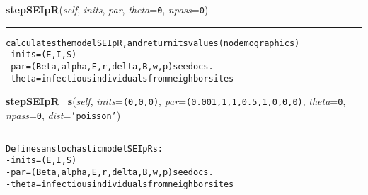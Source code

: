     \vspace{0.5ex}

    \begin{boxedminipage}{\textwidth}

    \raggedright \textbf{stepSEIpR}(\textit{self}, \textit{inits}, \textit{par}, \textit{theta}=\texttt{0}, \textit{npass}=\texttt{0})

    \vspace{-1.5ex}

    \rule{\textwidth}{0.5\fboxrule}
\begin{alltt}

calculates the model SEIpR, and return its values (no demographics)
- inits = (E,I,S)
- par = (Beta, alpha, E,r,delta,B, w, p) see docs.
- theta = infectious individuals from neighbor sites
\end{alltt}

    \vspace{1ex}

    \end{boxedminipage}

    \label{Epigrass:simobj:popmodels:stepSEIpR_s}

    \vspace{0.5ex}

    \begin{boxedminipage}{\textwidth}

    \raggedright \textbf{stepSEIpR\_s}(\textit{self}, \textit{inits}=\texttt{(0,0,0)}, \textit{par}=\texttt{(0.001,1,1,0.5,1,0,0,0)}, \textit{theta}=\texttt{0}, \textit{npass}=\texttt{0}, \textit{dist}=\texttt{'poisson'})

    \vspace{-1.5ex}

    \rule{\textwidth}{0.5\fboxrule}
\begin{alltt}

Defines an stochastic model SEIpRs:
- inits = (E,I,S)
- par = (Beta, alpha, E,r,delta,B,w,p) see docs.
- theta = infectious individuals from neighbor sites
\end{alltt}

    \vspace{1ex}

    \end{boxedminipage}

    \label{Epigrass:simobj:popmodels:stepSIRS}

